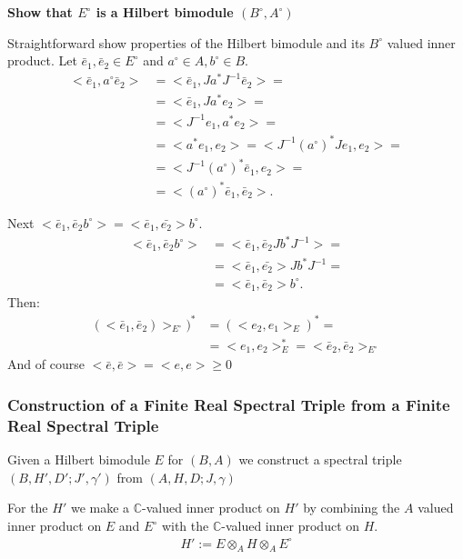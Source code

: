 \documentclass[a4paper]{article}
\newcounter{exercise}
\newenvironment{MyExercise}%
{\begin{mdframed}[style=exercisestyle]}{\end{mdframed}}
\theoremstyle{definition}
\theoremstyle{definition}
\theoremstyle{definition}
\theoremstyle{theorem}
\theoremstyle{theorem}
\begin{document}
\begin{MyExercise}
    \textbf{Show that $E^\circ$ is a Hilbert bimodule $(B^{\circ}, A^{\circ})$
    }\newline


    Straightforward show properties of the Hilbert bimodule and its $B^{\circ}$
    valued inner product. Let $\bar{e}_1, \bar{e}_2 \in E^{\circ}$ and $a^\circ \in A,
    b^\circ \in B$. \\
    \begin{align*}
        <\bar{e}_1, a^\circ \bar{e}_2> &= <\bar{e}_1, Ja^*J^{-1} \bar{e}_2>=\\
        &= <\bar{e}_1 , J a^* e_2> = \\
        &= <J^{-1} e_1, a^* e_2> =\\
        & = <a^* e_1, e_2>= <J^{-1}(a^\circ)^* J e_1, e_2> = \\
        & = <J^{-1} (a^\circ)^* \bar{e}_1, e_2> =\\
        & = <(a^\circ)^* \bar{e}_1 , \bar{e}_2>.
    \end{align*}

    Next $<\bar{e}_1, \bar{e}_2 b^\circ> = <\bar{e}_1, \bar{e_2}> b^\circ$.
    \begin{align*}
        <\bar{e}_1, \bar{e}_2 b^\circ>  &= <\bar{e}_1, \bar{e}_2 Jb^*J^{-1}> =\\
        &= <\bar{e}_1, \bar{e_2}> Jb^*J^{-1} = \\
        &= <\bar{e}_1, \bar{e}_2> b^\circ.
    \end{align*}
    Then:
    \begin{align*}
        (<\bar{e}_1, \bar{e}_2)>_{E^\circ})^* &= (<e_2, e_1>_E)^* =\\
        &= <e_1, e_2>_E^* = <\bar{e}_2, \bar{e}_2>_{E^\circ}
    \end{align*}
    And of course $<\bar{e}, \bar{e}> = <e, e> \geq 0$
\end{MyExercise}

\subsubsection{Construction of a Finite Real Spectral Triple from a Finite
Real Spectral Triple}
Given a Hilbert bimodule $E$ for $(B, A)$ we construct a spectral triple
$(B, H', D'; J', \gamma ')$ from $(A, H, D; J, \gamma)$

For the $H'$ we make a $\mathbb{C}$-valued inner product on $H'$ by combining
the $A$ valued inner product on $E$ and $E^\circ$ with the
$\mathbb{C}$-valued inner product on $H$.
\begin{align}
    H' := E\otimes _A H \otimes _A E^\circ
\end{align}
\end{document}
